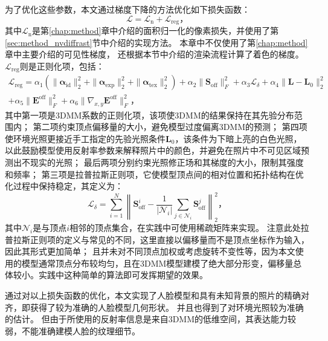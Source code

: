 为了优化这些参数，本文通过梯度下降的方法优化如下损失函数：
\begin{equation}
    \mathcal{L} = \mathcal{L}_\mathrm{n} + \mathcal{L}_\mathrm{reg}
    \text{，}
\end{equation}
其中$\mathcal{L}_\mathrm{n}$是第\ref{chap:method}章中介绍的面积归一化的像素损失，并使用了第\ref{sec:method_nvdiffrast}节中介绍的实现方法。
本章中不仅使用了第\ref{chap:method}章中主要介绍的可见性梯度，
还根据本节中介绍的渲染流程计算了着色的梯度。
$\mathcal{L}_\mathrm{reg}$则是正则化项，包括：
\begin{equation}
\begin{split}
\mathcal{L}_\mathrm{reg} = \alpha_1\left(\| \mathbf{\alpha}_\mathrm{id} \|_2^2 +
    \| \mathbf{\alpha}_\mathrm{exp} \|_2^2 +
    \| \mathbf{\alpha}_\mathrm{tex} \|_2^2\right) +
    \alpha_2 \| \mathbf{S}_\mathrm{off} \|_F^2 +
    \alpha_3 \mathcal{L}_\delta +
    \alpha_4 \| \mathbf{L}-\mathbf{L}_0 \|_2^2 \\
    + \alpha_5 \| \mathbf{E}^\mathrm{off} \|_F^2 +
    \alpha_6 \| \nabla_{x,y} \mathbf{E}^\mathrm{off} \|_F^2
    \text{，}
\end{split}
\end{equation}
其中第一项是3DMM系数的正则化项，该项使3DMM的结果保持在其先验分布范围内；
第二项约束顶点偏移量的大小，避免模型过度偏离3DMM的预测；
第四项使环境光照更接近手工指定的先验光照条件$\mathbf{L}_0$，该条件为下暗上亮的白色光照，以此鼓励模型使用反射率参数来解释照片中的颜色，并避免在照片中不可见区域预测出不现实的光照；
最后两项分别约束光照修正场和其梯度的大小，限制其强度和频率；
第三项是拉普拉斯正则项，它使模型顶点间的相对位置和拓扑结构在优化过程中保持稳定，其定义为：
\begin{equation}
    \mathcal{L}_\delta = \sum_{i=1}^N \left\|\mathbf{S}_\mathrm{off}^i - \frac{1}{|\mathcal{N}_i|}\sum_{j\in\mathcal{N}_i} \mathbf{S}_\mathrm{off}^j\right\|_2^2
    \text{，}
\end{equation}
其中$\mathcal{N}_i$是与顶点$i$相邻的顶点集合，在实践中可使用稀疏矩阵来实现。
注意此处拉普拉斯正则项的定义与常见的不同，这里直接以偏移量而不是顶点坐标作为输入，因此其形式更加简单；
且并未对不同顶点加权或考虑旋转不变性等，因为本文使用的模型通常顶点分布较均匀，且在3DMM模型建模了绝大部分形变，偏移量总体较小。实践中这种简单的算法即可发挥期望的效果。

通过对以上损失函数的优化，本文实现了人脸模型和具有未知背景的照片的精确对齐，即获得了较为准确的人脸模型几何形状。
并且也得到了对环境光照较为准确的估计。
但由于所使用的反射率信息是来自3DMM的低维空间，其表达能力较弱，不能准确建模人脸的纹理细节。

